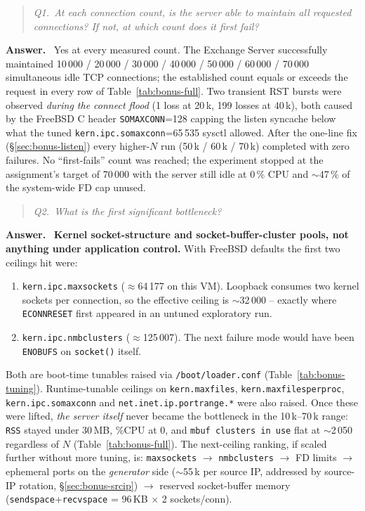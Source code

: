 \documentclass[11pt,a4paper]{article}
\newcommand{\qbox}[1]{%
  \begin{quote}\itshape #1\end{quote}%
}
\newenvironment{answer}
  {\begin{answerbox}\textbf{\color{accent}Answer.}\ }
  {\end{answerbox}}
\begin{document}
\qbox{Q1.\ At each connection count, is the server able to maintain all requested
connections?  If not, at which count does it first fail?}

\begin{answer}
Yes at every measured count. The Exchange Server successfully maintained
10\,000 / 20\,000 / 30\,000 / 40\,000 / 50\,000 / 60\,000 / 70\,000 simultaneous
idle TCP connections; the established count equals or exceeds the request in
every row of Table~\ref{tab:bonus-full}.  Two transient RST bursts were
observed \emph{during the connect flood} (1 loss at 20\,k, 199 losses at
40\,k), both caused by the FreeBSD C header \texttt{SOMAXCONN}=128 capping the
listen syncache below what the tuned \texttt{kern.ipc.somaxconn}=65\,535 sysctl
allowed.  After the one-line fix (\S\ref{sec:bonus-listen}) every higher-$N$
run (50\,k / 60\,k / 70\,k) completed with zero failures.  No ``first-fails''
count was reached; the experiment stopped at the assignment's target of
70\,000 with the server still idle at 0\,\% CPU and $\sim$47\,\% of the
system-wide FD cap unused.
\end{answer}

\qbox{Q2.\ What is the first significant bottleneck?}

\begin{answer}
\textbf{Kernel socket-structure and socket-buffer-cluster pools, not anything
under application control.}  With FreeBSD defaults the first two ceilings hit
were:
\begin{enumerate}[leftmargin=1.5em,itemsep=0.15em]
  \item \texttt{kern.ipc.maxsockets} ($\approx$64\,177 on this VM). Loopback
        consumes two kernel sockets per connection, so the effective ceiling
        is $\sim$32\,000 -- exactly where \texttt{ECONNRESET} first appeared
        in an untuned exploratory run.
  \item \texttt{kern.ipc.nmbclusters} ($\approx$125\,007). The next failure
        mode would have been \texttt{ENOBUFS} on \texttt{socket()} itself.
\end{enumerate}
Both are boot-time tunables raised via \texttt{/boot/loader.conf}
(Table~\ref{tab:bonus-tuning}).  Runtime-tunable ceilings on
\texttt{kern.maxfiles}, \texttt{kern.maxfilesperproc},
\texttt{kern.ipc.somaxconn} and \texttt{net.inet.ip.portrange.*} were also
raised.  Once these were lifted, \emph{the server itself} never became the
bottleneck in the 10\,k--70\,k range: \texttt{RSS} stayed under 30\,MB,
\%CPU at 0, and \texttt{mbuf clusters in use} flat at $\sim$2\,050 regardless
of $N$ (Table~\ref{tab:bonus-full}).  The next-ceiling ranking, if scaled
further without more tuning, is:
\texttt{maxsockets} $\to$ \texttt{nmbclusters} $\to$ FD limits
$\to$ ephemeral ports on the \emph{generator} side ($\sim$55\,k per source
IP, addressed by source-IP rotation, \S\ref{sec:bonus-srcip})
$\to$ reserved socket-buffer memory
(\texttt{sendspace}+\texttt{recvspace} = 96\,KB $\times$ 2 sockets/conn).
\end{answer}
\end{document}
